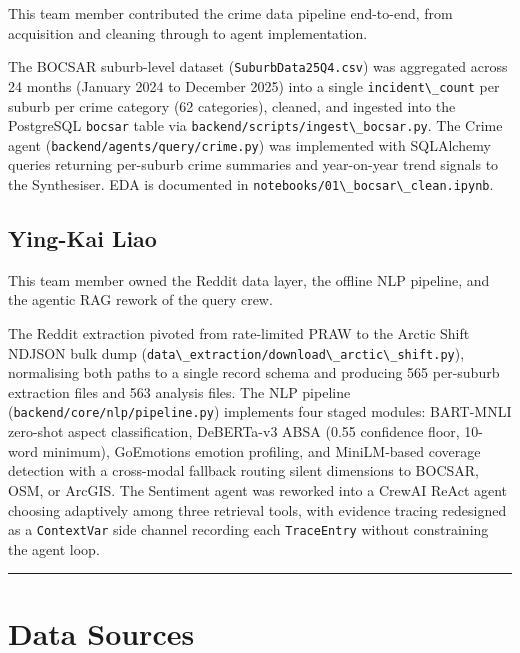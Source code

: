 \documentclass[11pt,a4paper]{article}
\newcommand{\passthrough}[1]{#1}
\begin{document}
This team member contributed the crime data pipeline end-to-end, from acquisition and cleaning through to agent implementation.

The BOCSAR suburb-level dataset (\passthrough{\lstinline!SuburbData25Q4.csv!}) was aggregated across 24 months (January 2024 to December 2025) into a single \passthrough{\lstinline!incident\_count!} per suburb per crime category (62 categories), cleaned, and ingested into the PostgreSQL \passthrough{\lstinline!bocsar!} table via \passthrough{\lstinline!backend/scripts/ingest\_bocsar.py!}. The Crime agent (\passthrough{\lstinline!backend/agents/query/crime.py!}) was implemented with SQLAlchemy queries returning per-suburb crime summaries and year-on-year trend signals to the Synthesiser. EDA is documented in \passthrough{\lstinline!notebooks/01\_bocsar\_clean.ipynb!}.

\subsection{Ying-Kai Liao}\label{ying-kai-liao}

This team member owned the Reddit data layer, the offline NLP pipeline, and the agentic RAG rework of the query crew.

The Reddit extraction pivoted from rate-limited PRAW to the Arctic Shift NDJSON bulk dump (\passthrough{\lstinline!data\_extraction/download\_arctic\_shift.py!}), normalising both paths to a single record schema and producing 565 per-suburb extraction files and 563 analysis files. The NLP pipeline (\passthrough{\lstinline!backend/core/nlp/pipeline.py!}) implements four staged modules: BART-MNLI zero-shot aspect classification, DeBERTa-v3 ABSA (0.55 confidence floor, 10-word minimum), GoEmotions emotion profiling, and MiniLM-based coverage detection with a cross-modal fallback routing silent dimensions to BOCSAR, OSM, or ArcGIS. The Sentiment agent was reworked into a CrewAI ReAct agent choosing adaptively among three retrieval tools, with evidence tracing redesigned as a \passthrough{\lstinline!ContextVar!} side channel recording each \passthrough{\lstinline!TraceEntry!} without constraining the agent loop.

\begin{center}\rule{0.5\linewidth}{0.5pt}\end{center}

\section{Data Sources}\label{4-data-sources}
\end{document}
